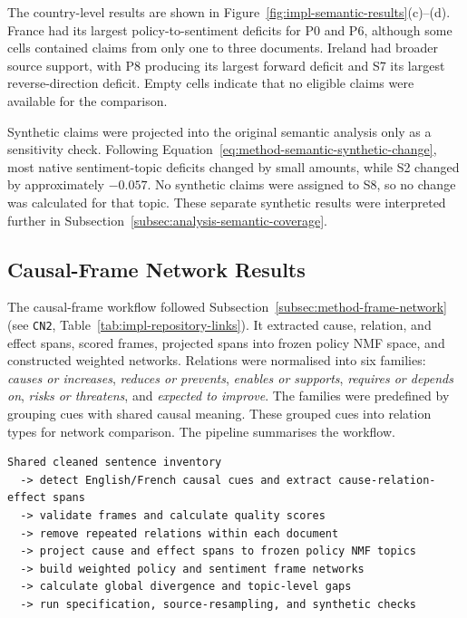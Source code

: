 The country-level results are shown in
Figure~\ref{fig:impl-semantic-results}(c)--(d). France had its largest
policy-to-sentiment deficits for P0 and P6, although some cells contained claims from
only one to three documents. Ireland had broader source support, with P8 producing
its largest forward deficit and S7 its largest reverse-direction deficit. Empty cells
indicate that no eligible claims were available for the comparison.

Synthetic claims were projected into the original semantic analysis only as a
sensitivity check. Following Equation~\ref{eq:method-semantic-synthetic-change}, most
native sentiment-topic deficits changed by small amounts, while S2 changed by
approximately \(-0.057\). No synthetic claims were assigned to S8, so no change was
calculated for that topic. These separate synthetic results were interpreted further
in Subsection~\ref{subsec:analysis-semantic-coverage}.

\subsection{Causal-Frame Network Results}
\label{subsec:impl-frame-networks}

The causal-frame workflow followed Subsection~\ref{subsec:method-frame-network} (see
\texttt{CN2}, Table~\ref{tab:impl-repository-links}). It extracted cause, relation,
and effect spans, scored frames, projected spans into frozen policy NMF space, and
constructed weighted networks. Relations were normalised into six families:
\textit{causes or increases}, \textit{reduces or prevents},
\textit{enables or supports}, \textit{requires or depends on},
\textit{risks or threatens}, and \textit{expected to improve}.
{\color{blue}The families were predefined by grouping cues with shared causal meaning.}
These grouped cues into relation types for network comparison. The pipeline summarises
the workflow.


{\small
\begin{verbatim}
Shared cleaned sentence inventory
  -> detect English/French causal cues and extract cause-relation-effect spans
  -> validate frames and calculate quality scores
  -> remove repeated relations within each document
  -> project cause and effect spans to frozen policy NMF topics
  -> build weighted policy and sentiment frame networks
  -> calculate global divergence and topic-level gaps
  -> run specification, source-resampling, and synthetic checks
\end{verbatim}
}

